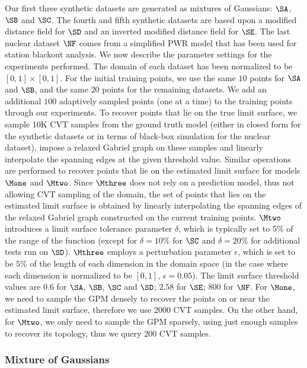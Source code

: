 Our first three synthetic datasets are generated as mixtures of Gaussians: $\SA$, $\SB$ and $\SC$.
%
The fourth and fifth synthetic datasets are based upon a modified distance field for $\SD$ and an inverted modified distance field for $\SE$.
%
The last nuclear dataset $\NF$ comes from a simplified PWR model that has been used for station blackout analysis.
%
We now describe the parameter settings for the experiments performed.
%
The domain of each dataset has been normalized to be $[0,1] \times [0,1]$.
%
For the initial training points, we use the same $10$ points for $\SA$ and $\SB$, and the same $20$ points for the remaining datasets.
%
We add an additional $100$ adaptively sampled points (one at a time) to the training points through our experiments.
%
To recover points that lie on the true limit surface, we sample 10K CVT samples from the ground truth model (either in closed form for the synthetic datasets or in terms of black-box simulation for the nuclear dataset), impose a relaxed Gabriel graph on these samples and linearly interpolate the spanning edges at the given threshold value.
%
Similar operations are performed to recover points that lie on the estimated limit surface for models $\Mone$ and $\Mtwo$.
%
Since $\Mthree$ does not rely on a prediction model, thus not allowing CVT sampling of the domain, the set of points that lies on the estimated limit surface is obtained by linearly interpolating the spanning edges of the relaxed Gabriel graph constructed on the current training points.
%
$\Mtwo$ introduces a limit surface tolerance parameter $\delta$, which is typically set to $5\%$ of the range of the function (except for $\delta = 10\%$ for $\SC$ and $\delta = 20\%$ for additional tests run on $\SD$).
%
$\Mthree$ employs a perturbation parameter $\epsilon$, which is set to be $5\%$ of the length of each dimension in the domain space (in the case where each dimension is normalized to be $[0,1]$, $\epsilon = 0.05$).
%
The limit surface threshold values are $0.6$ for $\SA$, $\SB$, $\SC$ and $\SD$;
%
$2.58$ for $\SE$; $800$ for $\NF$.
%
For $\Mone$, we need to sample the GPM densely to recover the points on or near the estimated limit surface, therefore we use $2000$ CVT samples.
%
On the other hand, for $\Mtwo$, we only need to sample the GPM sparsely, using just enough samples to recover its topology, thus we query $200$ CVT samples.


\subsubsection{Mixture of Gaussians}

